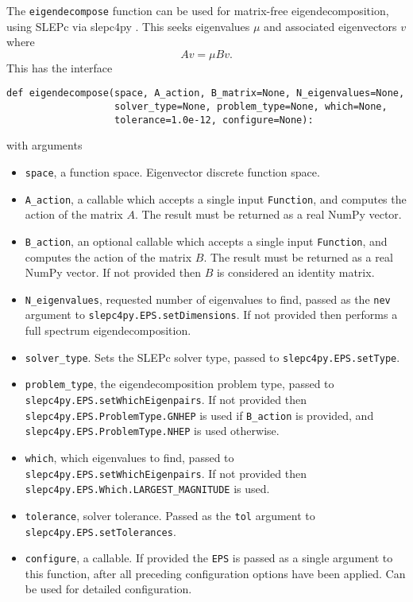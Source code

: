 \documentclass[11pt]{article}
\begin{document}
The \texttt{eigendecompose} function can be used for matrix-free
eigendecomposition, using SLEPc via slepc4py
\citep{hernandez2005,dalcin2011,slepc-user-3.9}. This seeks eigenvalues $\mu$
and associated eigenvectors $v$ where
\begin{equation*}
  A v = \mu B v.
\end{equation*}
This has the interface
\begin{lstlisting}
def eigendecompose(space, A_action, B_matrix=None, N_eigenvalues=None,
                   solver_type=None, problem_type=None, which=None,
                   tolerance=1.0e-12, configure=None):
\end{lstlisting}
with arguments
\begin{itemize}
  \item \texttt{space}, a function space. Eigenvector discrete function space.
  \item \texttt{A\_action}, a callable which accepts a single input
    \texttt{Function}, and computes the action of the matrix $A$. The result
    must be returned as a real NumPy vector.
  \item \texttt{B\_action}, an optional callable which accepts a single input
    \texttt{Function}, and computes the action of the matrix $B$. The result
    must be returned as a real NumPy vector. If not provided then $B$ is
    considered an identity matrix.
  \item \texttt{N\_eigenvalues}, requested number of eigenvalues to find,
    passed as the \texttt{nev} argument to \texttt{slepc4py.EPS.setDimensions}.
    If not provided then performs a full spectrum eigendecomposition.
  \item \texttt{solver\_type}. Sets the SLEPc solver type, passed to
    \texttt{slepc4py.EPS.setType}.
  \item \texttt{problem\_type}, the eigendecomposition problem type, passed to
    \texttt{slepc4py.EPS.setWhichEigenpairs}. If not provided then
    \texttt{slepc4py.EPS.ProblemType.GNHEP} is used if \texttt{B\_action} is
    provided, and \texttt{slepc4py.EPS.ProblemType.NHEP} is used otherwise.
  \item \texttt{which}, which eigenvalues to find, passed to
    \texttt{slepc4py.EPS.setWhichEigenpairs}. If not provided then
    \texttt{slepc4py.EPS.Which.LARGEST\_MAGNITUDE} is used.
  \item \texttt{tolerance}, solver tolerance. Passed as the \texttt{tol}
   argument to \texttt{slepc4py.EPS.setTolerances}.
  \item \texttt{configure}, a callable. If provided the \texttt{EPS} is passed
    as a single argument to this function, after all preceding configuration
    options have been applied. Can be used for detailed configuration.
\end{itemize}
\end{document}
